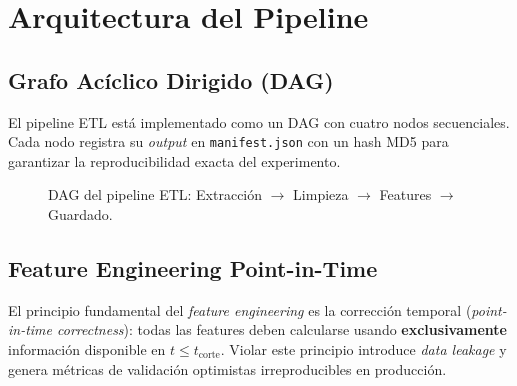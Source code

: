 \documentclass[12pt, letterpaper]{article}
\begin{document}
\section{Arquitectura del Pipeline}

\subsection{Grafo Acíclico Dirigido (DAG)}

El pipeline ETL está implementado como un DAG con cuatro nodos secuenciales.
Cada nodo registra su \textit{output} en \texttt{manifest.json} con un hash
MD5 para garantizar la reproducibilidad exacta del experimento.

\begin{figure}[H]
\centering
\begin{tikzpicture}[node distance=2.5cm, auto]
\end{tikzpicture}
\caption{DAG del pipeline ETL: Extracción $\to$ Limpieza $\to$ Features $\to$ Guardado.}
\label{fig:dag}
\end{figure}

\subsection{Feature Engineering Point-in-Time}

El principio fundamental del \textit{feature engineering} es la corrección
temporal (\textit{point-in-time correctness}): todas las features deben
calcularse usando \textbf{exclusivamente} información disponible en
$t \leq t_{\text{corte}}$. Violar este principio introduce \textit{data leakage}
y genera métricas de validación optimistas irreproducibles en producción.
\end{document}
